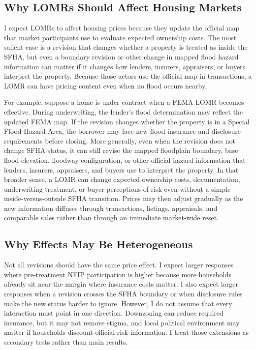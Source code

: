 \documentclass[12pt]{article}
\begin{document}
\subsection{Why LOMRs Should Affect Housing Markets}\label{sec:bg_channels}

I expect LOMRs to affect housing prices because they update the official map that market participants use to evaluate expected ownership costs. The most salient case is a revision that changes whether a property is treated as inside the SFHA, but even a boundary revision or other change in mapped flood hazard information can matter if it changes how lenders, insurers, appraisers, or buyers interpret the property. Because those actors use the official map in transactions, a LOMR can have pricing content even when no flood occurs nearby.

For example, suppose a home is under contract when a FEMA LOMR becomes effective. During underwriting, the lender's flood determination may reflect the updated FEMA map. If the revision changes whether the property is in a Special Flood Hazard Area, the borrower may face new flood-insurance and disclosure requirements before closing. More generally, even when the revision does not change SFHA status, it can still revise the mapped floodplain boundary, base flood elevation, floodway configuration, or other official hazard information that lenders, insurers, appraisers, and buyers use to interpret the property. In that broader sense, a LOMR can change expected ownership costs, documentation, underwriting treatment, or buyer perceptions of risk even without a simple inside-versus-outside SFHA transition. Prices may then adjust gradually as the new information diffuses through transactions, listings, appraisals, and comparable sales rather than through an immediate market-wide reset.

\subsection{Why Effects May Be Heterogeneous}\label{sec:bg_heterogeneity}

Not all revisions should have the same price effect. I expect larger responses where pre-treatment NFIP participation is higher because more households already sit near the margin where insurance costs matter. I also expect larger responses when a revision crosses the SFHA boundary or when disclosure rules make the new status harder to ignore. However, I do not assume that every interaction must point in one direction. Downzoning can reduce required insurance, but it may not remove stigma, and local political environment may matter if households discount official risk information. I treat those extensions as secondary tests rather than main results.
\end{document}
